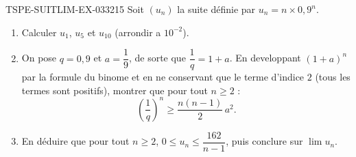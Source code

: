 \begin{exercice}{TSPE-SUITLIM-EX-033}{2}{15}
Soit $(u_n)$ la suite définie par $u_n = n \times 0{,}9^n$.
\begin{enumerate}
  \item Calculer $u_1$, $u_5$ et $u_{10}$ (arrondir a $10^{-2}$).
  \item On pose $q = 0{,}9$ et $a = \dfrac{1}{9}$, de sorte que $\dfrac{1}{q} = 1 + a$. En developpant $(1+a)^n$ par la formule du binome et en ne conservant que le terme d'indice $2$ (tous les termes sont positifs), montrer que pour tout $n \geq 2$ :
  \[
    \left(\frac{1}{q}\right)^n \geq \frac{n(n-1)}{2}\,a^2.
  \]
  \item En déduire que pour tout $n \geq 2$, $0 \leq u_n \leq \dfrac{162}{n-1}$, puis conclure sur $\lim u_n$.
\end{enumerate}
\end{exercice}

